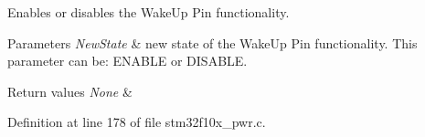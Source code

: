 Enables or disables the Wake\+Up Pin functionality. 


\begin{DoxyParams}{Parameters}
{\em New\+State} & new state of the Wake\+Up Pin functionality. This parameter can be\+: E\+N\+A\+B\+LE or D\+I\+S\+A\+B\+LE. \\
\hline
\end{DoxyParams}

\begin{DoxyRetVals}{Return values}
{\em None} & \\
\hline
\end{DoxyRetVals}


Definition at line 178 of file stm32f10x\+\_\+pwr.\+c.

